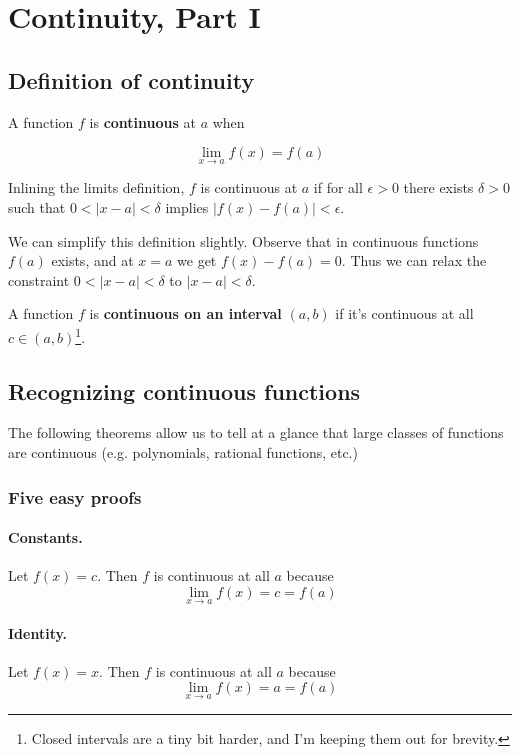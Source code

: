 \section{Continuity, Part I}

\subsection{Definition of continuity}

A function $f$ is \textbf{continuous} at $a$ when

\[\lim_{x\to a}f(x)=f(a)\]

Inlining the limits definition, $f$ is continuous at $a$ if for all
$\epsilon>0$ there exists $\delta>0$ such that $0<|x-a|<\delta$ implies
$|f(x)-f(a)|<\epsilon$.

\vs

We can simplify this definition slightly. Observe that in continuous
functions $f(a)$ exists, and at $x=a$ we get $f(x)-f(a)=0$. Thus we
can relax the constraint $0<|x-a|<\delta$ to $|x-a|<\delta$.

\vs

A function $f$ is \textbf{continuous on an interval} $(a, b)$ if it's
continuous at all $c\in(a,b)$\footnote{Closed intervals are a tiny bit
  harder, and I'm keeping them out for brevity.}.

\subsection{Recognizing continuous functions}
The following theorems allow us to tell at a glance that large classes
of functions are continuous (e.g. polynomials, rational functions,
etc.)

\subsubsection*{Five easy proofs}

\paragraph{Constants.} Let $f(x)=c$. Then $f$ is continuous at all $a$
because
\[\lim_{x\to a}f(x)=c=f(a)\]

\paragraph{Identity.} Let $f(x)=x$. Then $f$ is continuous at all $a$
because
\[\lim_{x\to a}f(x)=a=f(a)\]

